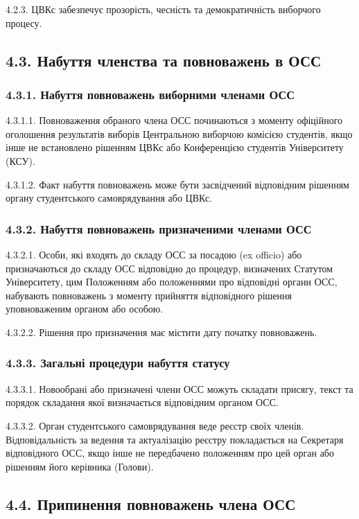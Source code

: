     4.2.3. ЦВКс забезпечує прозорість, чесність та демократичність виборчого процесу.

\subsection*{4.3. Набуття членства та повноважень в ОСС}
    \subsubsection*{4.3.1. Набуття повноважень виборними членами ОСС}
        4.3.1.1. Повноваження обраного члена ОСС починаються з моменту офіційного оголошення результатів виборів Центральною виборчою комісією студентів, якщо інше не встановлено рішенням ЦВКс або Конференцією студентів Університету (КСУ).

        4.3.1.2. Факт набуття повноважень може бути засвідчений відповідним рішенням органу студентського самоврядування або ЦВКс.

    \subsubsection*{4.3.2. Набуття повноважень призначеними членами ОСС}
        4.3.2.1. Особи, які входять до складу ОСС за посадою (ex officio) або призначаються до складу ОСС відповідно до процедур, визначених Статутом Університету, цим Положенням або положеннями про відповідні органи ОСС, набувають повноважень з моменту прийняття відповідного рішення уповноваженим органом або особою.

        4.3.2.2. Рішення про призначення має містити дату початку повноважень.

    \subsubsection*{4.3.3. Загальні процедури набуття статусу}
        4.3.3.1. Новообрані або призначені члени ОСС можуть складати присягу, текст та порядок складання якої визначається відповідним органом ОСС.

        4.3.3.2. Орган студентського самоврядування веде реєстр своїх членів. Відповідальність за ведення та актуалізацію реєстру покладається на Секретаря відповідного ОСС, якщо інше не передбачено положенням про цей орган або рішенням його керівника (Голови).

\subsection*{4.4. Припинення повноважень члена ОСС}
